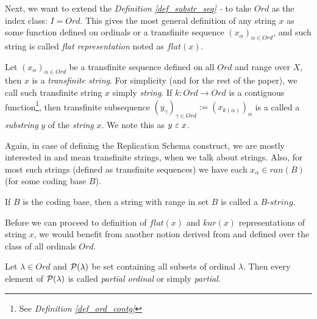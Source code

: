 Next, we want to extend the \textit{Definition \ref{def_substr_seq} - } to take $Ord$ as the index class: $I = Ord$. This gives the most general definition of any string $x$ as some function defined on ordinals or a transfinite sequence $(x_{\alpha})_{\alpha \in Ord}$, and such string is called \textit{flat representation} noted as $flat(x)$.

\begin{definition}\label{def_transfinite_strings}
    Let $(x_{\alpha})_{\alpha \in Ord}$ be a transfinite sequence defined on all $Ord$ and range over $X$, then $x$ is a \textit{transfinite string}. For simplicity (and for the rest of the paper), we call such transfinite string $x$ simply \textit{string}. If $k : Ord \to Ord$ is a contiguous function\footnote{See \textit{Definition \ref{def_ord_contg}}}, then transfinite subsequence $(y_{\gamma})_{\gamma \in Ord} := (x_{k(\alpha)})_{\alpha}$ is a called a \textit{substring} $y$ of the \textit{string} $x$. We note this as $y \ \varepsilon\  x$.
\end{definition}

Again, in case of defining the Replication Schema construct, we are mostly interested in and mean transfinite strings, when we talk about strings. Also, for most such strings (defined as transfinite sequences) we have each $x_\alpha \in ran(B)$ (for some coding base $B$).

\begin{definition}[$B$-strings]\label{def_base_strings}
    If $B$ is the coding base, then a string with range in set $B$ is called a $B\textit{-string}$.
\end{definition}

Before we can proceed to definition of $flat(x)$ and $kur(x)$ representations of string $x$, we would benefit from another notion derived from and defined over the class of all ordinals $Ord$.

\begin{definition}\label{def_part_ord}
    Let $\lambda \in Ord$ and $\mathcal{P}(\lambda)$ be set containing all subsets of ordinal $\lambda$. Then every element of $\mathcal{P}(\lambda)$ is called \textit{partial ordinal} or simply \textit{partial}.
\end{definition}

